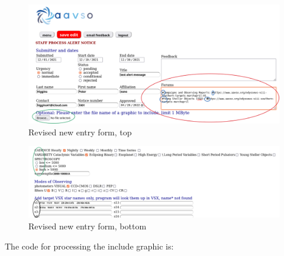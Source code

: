 \documentclass[11pt]{article}
\begin{document}
\begin{figure}[hbtp]
\centering
\includegraphics{edittop.png}
\caption{Revised new entry form, top
}
\end{figure}


\begin{figure}[hbtp]
\centering
\includegraphics[scale=1.0]{editbottom.png}
\caption{Revised new entry form, bottom}
\end{figure}

The code for processing the include graphic is:
\end{document}
